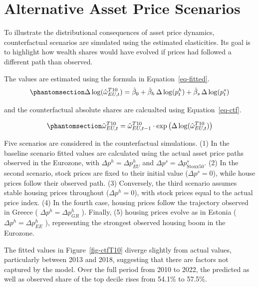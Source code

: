 \documentclass[
  a4paper,
  DIV=11,
  numbers=noendperiod]{scrartcl}
\begin{document}
\section{Alternative Asset Price Scenarios}\label{sec-simulation}

To illustrate the distributional consequences of asset price dynamics,
counterfactual scenarios are simulated using the estimated elasticities.
Its goal is to highlight how wealth shares would have evolved if prices
had followed a different path than observed.

The values are estimated using the formula in Equation~\ref{eq-fitted}.
\begin{equation}\phantomsection\label{eq-fitted}{
\Delta \log (\hat{\omega}_{EU,t}^{T10}) = \hat{\beta}_0 + \hat{\beta}_h \, \Delta \log (p_{t}^h) + \hat{\beta}_s \, \Delta \log(p_t^s)
}\end{equation}

and the counterfactual absolute shares are calcualted using
Equation~\ref{eq-ctf}.

\begin{equation}\phantomsection\label{eq-ctf}{
\hat{\omega}_{EU,t}^{T10}  = \hat{\omega}_{EU,t-1}^{T10} \cdot \exp \left( \Delta \log (\hat{\omega}_{EU,t}^{T10}) \right)
}\end{equation}

Five scenarios are considered in the counterfactual simulations. (1) In
the baseline scenario fitted values are calculated using the actual
asset price paths observed in the Eurozone, with
\(\Delta p^h = \Delta p_{EU}^h\) and
\(\Delta p^s = \Delta p^s_{\text{Stoxx50}}\). (2) In the second
scenario, stock prices are fixed to their initial value
(\(\Delta p^s = 0\)), while house prices follow their observed path. (3)
Conversely, the third scenario assumes stable housing prices throughout
(\(\Delta p^h = 0\)), with stock prices equal to the actual price index.
(4) In the fourth case, housing prices follow the trajectory observed in
Greece ( \(\Delta p^h = \Delta p^h_{GR}\) ). Finally, (5) housing prices
evolve as in Estonia ( \(\Delta p^h = \Delta p^h_{EE}\) ), representing
the strongest observed housing boom in the Eurozone.

The fitted values in Figure~\ref{fig-ctfT10} diverge slightly from
actual values, particularly between 2013 and 2018, suggesting that there
are factors not captured by the model. Over the full period from 2010 to
2022, the predicted as well as observed share of the top decile rises
from 54.1\% to 57.5\%.
\end{document}
